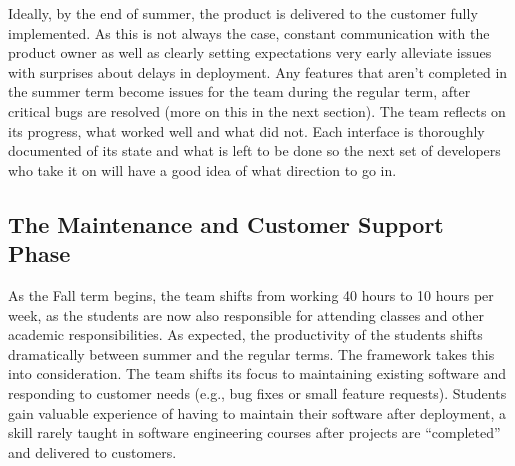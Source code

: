 Ideally, by the end of summer, the product is delivered to the customer fully implemented. As this is not always the case, constant communication with the product owner as well as clearly setting expectations very early alleviate issues with surprises about delays in deployment. Any features that aren't completed in the summer term become issues for the team during the regular term, after critical bugs are resolved (more on this in the next section). The team reflects on its progress, what worked well and what did not. Each interface is thoroughly documented of its state and what is left to be done so the next set of developers who take it on will have a good idea of what direction to go in.

\subsection{The Maintenance and Customer Support Phase}
As the Fall term begins, the team shifts from working 40 hours to 10 hours per week, as the students are now also responsible for attending classes and other academic responsibilities. As expected, the productivity of the students shifts dramatically between summer and the regular terms. The framework takes this into consideration. The team shifts its focus to  maintaining existing software and responding to customer needs (e.g., bug fixes or small feature requests). Students gain valuable experience of having to maintain their software after deployment, a skill rarely taught in software engineering courses after projects are ``completed'' and delivered to customers.


